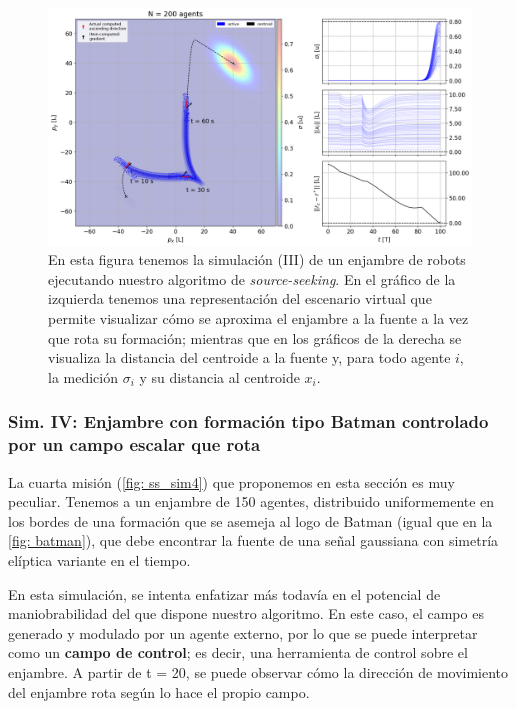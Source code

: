 \newpage

\begin{figure}[!h]
\centering
\includegraphics[trim={0cm 0.0cm 0cm 0.0cm}, clip, width=1\columnwidth]{./fig/ss_sim3.png}
\caption{En esta figura tenemos la simulación (III) de un enjambre de robots ejecutando nuestro algoritmo de \textit{source-seeking}. En el gráfico de la izquierda tenemos una representación del escenario virtual que permite visualizar cómo se aproxima el enjambre a la fuente a la vez que rota su formación; mientras que en los gráficos de la derecha se visualiza la distancia del centroide a la fuente y, para todo agente $i$, la medición $\sigma_i$ y su distancia al centroide $x_i$.}
\label{fig: ss_sim3}
\end{figure}

\subsubsection*{Sim. IV: Enjambre con formación tipo Batman controlado por un campo escalar que rota}

La cuarta misión (\autoref{fig: ss_sim4}) que proponemos en esta sección es muy peculiar. Tenemos a un enjambre de 150 agentes, distribuido uniformemente en los bordes de una formación que se asemeja al logo de Batman (igual que en la \autoref{fig: batman}), que debe encontrar la fuente de una señal gaussiana con simetría elíptica variante en el tiempo. 

En esta simulación, se intenta enfatizar más todavía en el potencial de maniobrabilidad del que dispone nuestro algoritmo. En este caso, el campo es generado y modulado por un agente externo, por lo que se puede interpretar como un \textbf{campo de control}; es decir, una herramienta de control sobre el enjambre. A partir de t = 20, se puede observar cómo la dirección de movimiento del enjambre rota según lo hace el propio campo.

